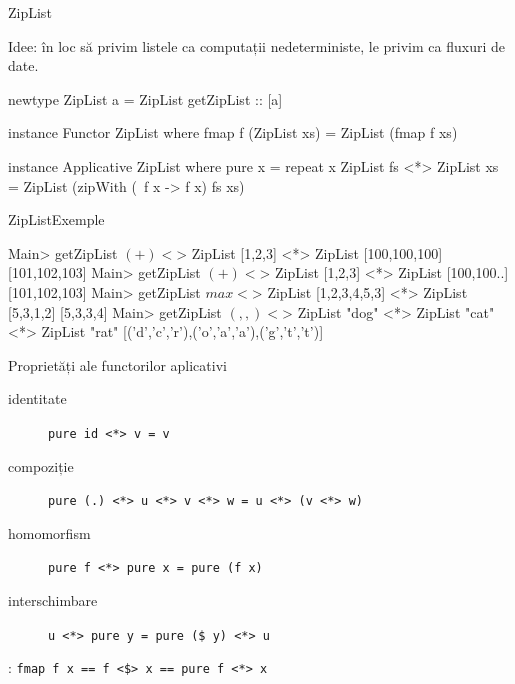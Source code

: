 \documentclass[xcolor=pdftex,romanian,colorlinks]{beamer}
\begin{document}
\begin{frame}[fragile]{ZipList}

Idee: în loc să privim listele ca computații nedeterministe, le privim ca fluxuri de date.

\begin{asciihs}
newtype ZipList a = ZipList { getZipList :: [a]}

instance Functor ZipList where
  fmap f (ZipList xs) = ZipList (fmap f xs)
  
instance Applicative ZipList where
  pure x = repeat x
  ZipList fs <*> ZipList xs = 
    ZipList (zipWith (\ f x -> f x) fs xs)
\end{asciihs}


\end{frame}

\begin{frame}[fragile]{ZipList}{Exemple}
\begin{asciihs}
Main> getZipList $ (+) <$> ZipList [1,2,3] <*> ZipList [100,100,100]  
[101,102,103]  
Main> getZipList $ (+) <$> ZipList [1,2,3] <*> ZipList [100,100..]  
[101,102,103]  
Main> getZipList $ max <$> ZipList [1,2,3,4,5,3] <*> ZipList [5,3,1,2]  
[5,3,3,4]  
Main> getZipList $ (,,) <$> ZipList "dog" <*> ZipList "cat" <*> ZipList "rat"  
[('d','c','r'),('o','a','a'),('g','t','t')]  
\end{asciihs}
\end{frame}

\begin{frame}{Proprietăți ale functorilor aplicativi}
\begin{description}
\item[identitate] \lstinline"pure id <*> v = v"
\item[compoziție] \lstinline"pure (.) <*> u <*> v <*> w = u <*> (v <*> w)"
\item[homomorfism] \lstinline"pure f <*> pure x = pure (f x)"
\item[interschimbare] \lstinline"u <*> pure y = pure ($ y) <*> u"
\end{description}

: \lstinline"fmap f x == f <$> x == pure f <*> x"
\end{frame}
\end{document}
